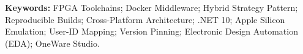 % 
% 
% 

\vspace{1cm}
\textbf{Keywords:} FPGA Toolchains; Docker Middleware; Hybrid Strategy Pattern; Reproducible Builds; Cross-Platform Architecture; .NET 10; Apple Silicon Emulation; User-ID Mapping; Version Pinning; Electronic Design Automation (EDA); OneWare Studio.
